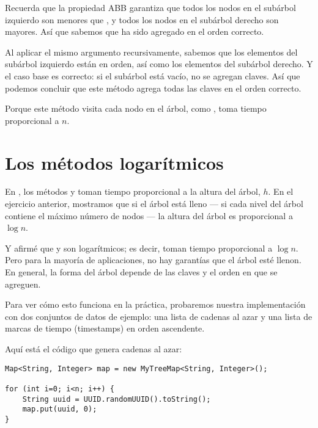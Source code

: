 \documentclass[12pt]{book}
\theoremstyle{exercise}
\begin{document}
Recuerda que la propiedad ABB garantiza que todos los nodos en el subárbol
izquierdo son menores que , y todos los nodos en el subárbol derecho
son mayores. Así que sabemos que  ha sido agregado en el orden
correcto.


Al aplicar el mismo argumento recursivamente, sabemos que los elementos del
subárbol izquierdo están en orden, así como los elementos del subárbol
derecho. Y el caso base es correcto: si el subárbol está vacío, no se
agregan claves. Así que podemos concluir que este método agrega todas las
claves en el orden correcto.

Porque este método visita cada nodo en el árbol, como
, toma tiempo proporcional a $n$.


\section{Los métodos logarítmicos}
\label{the-logarithmic-methods}

En , los métodos  y  toman
tiempo proporcional a la altura del árbol, $h$. En el ejercicio
anterior, mostramos que si el árbol está lleno --- si cada nivel del
árbol contiene el máximo número de nodos --- la altura del árbol es
proporcional a $\log n$.


Y afirmé que  y  son logarítmicos; es decir,
toman tiempo proporcional a $\log n$. Pero para la mayoría de
aplicaciones, no hay garantías que el árbol esté llenon. En general,
la forma del árbol depende de las claves y el orden en que se agreguen.

Para ver cómo esto funciona en la práctica, probaremos nuestra implementación
con dos conjuntos de datos de ejemplo: una lista de cadenas al azar y una
lista de marcas de tiempo (timestamps) en orden ascendente.


Aquí está el código que genera cadenas al azar:

\begin{verbatim}
Map<String, Integer> map = new MyTreeMap<String, Integer>();

for (int i=0; i<n; i++) {
    String uuid = UUID.randomUUID().toString();
    map.put(uuid, 0);
}
\end{verbatim}
\end{document}
